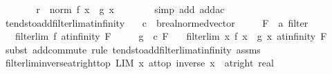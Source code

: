 \begin{isabellebody}
\ \ \ \ \isamarkupfalse%
\ \isamarkupfalse%
\ {\isachardoublequoteopen}r\ {\isasymle}\ norm\ {\isacharparenleft}{\kern0pt}f\ x\ {\isacharplus}{\kern0pt}\ g\ x{\isacharparenright}{\kern0pt}{\isachardoublequoteclose}\isanewline
\ \ \ \ \ \ \isamarkupfalse%
\ {\isacharparenleft}{\kern0pt}simp\ add{\isacharcolon}{\kern0pt}\ add{\isacharunderscore}{\kern0pt}ac{\isacharparenright}{\kern0pt}\isanewline
\ \ \isamarkupfalse%
\isanewline
{}\isamarkupfalse%
%
\endisatagproof
{\isafoldproof}%
%
\isadelimproof
\isanewline
%
\endisadelimproof
\isanewline
{}\isamarkupfalse%
\ tendsto{\isacharunderscore}{\kern0pt}add{\isacharunderscore}{\kern0pt}filterlim{\isacharunderscore}{\kern0pt}at{\isacharunderscore}{\kern0pt}infinity{\isacharprime}{\kern0pt}{\isacharcolon}{\kern0pt}\isanewline
\ \ \ c\ {\isacharcolon}{\kern0pt}{\isacharcolon}{\kern0pt}\ {\isachardoublequoteopen}{\isacharprime}{\kern0pt}b{\isacharcolon}{\kern0pt}{\isacharcolon}{\kern0pt}real{\isacharunderscore}{\kern0pt}normed{\isacharunderscore}{\kern0pt}vector{\isachardoublequoteclose}\isanewline
\ \ \ \ \ F\ {\isacharcolon}{\kern0pt}{\isacharcolon}{\kern0pt}\ {\isachardoublequoteopen}{\isacharprime}{\kern0pt}a\ filter{\isachardoublequoteclose}\isanewline
\ \ \ {\isachardoublequoteopen}filterlim\ f\ at{\isacharunderscore}{\kern0pt}infinity\ F{\isachardoublequoteclose}\isanewline
\ \ \ \ \ {\isachardoublequoteopen}{\isacharparenleft}{\kern0pt}g\ {\isasymlonglongrightarrow}\ c{\isacharparenright}{\kern0pt}\ F{\isachardoublequoteclose}\isanewline
\ \ \ {\isachardoublequoteopen}filterlim\ {\isacharparenleft}{\kern0pt}{\isasymlambda}x{\isachardot}{\kern0pt}\ f\ x\ {\isacharplus}{\kern0pt}\ g\ x{\isacharparenright}{\kern0pt}\ at{\isacharunderscore}{\kern0pt}infinity\ F{\isachardoublequoteclose}\isanewline
%
\isadelimproof
\ \ %
\endisadelimproof
%
\isatagproof
{}\isamarkupfalse%
\ {\isacharparenleft}{\kern0pt}subst\ add{\isachardot}{\kern0pt}commute{\isacharparenright}{\kern0pt}\ {\isacharparenleft}{\kern0pt}rule\ tendsto{\isacharunderscore}{\kern0pt}add{\isacharunderscore}{\kern0pt}filterlim{\isacharunderscore}{\kern0pt}at{\isacharunderscore}{\kern0pt}infinity\ assms{\isacharparenright}{\kern0pt}{\isacharplus}{\kern0pt}%
\endisatagproof
{\isafoldproof}%
%
\isadelimproof
\isanewline
%
\endisadelimproof
\isanewline
{}\isamarkupfalse%
\ filterlim{\isacharunderscore}{\kern0pt}inverse{\isacharunderscore}{\kern0pt}at{\isacharunderscore}{\kern0pt}right{\isacharunderscore}{\kern0pt}top{\isacharcolon}{\kern0pt}\ {\isachardoublequoteopen}LIM\ x\ at{\isacharunderscore}{\kern0pt}top{\isachardot}{\kern0pt}\ inverse\ x\ {\isacharcolon}{\kern0pt}{\isachargreater}{\kern0pt}\ at{\isacharunderscore}{\kern0pt}right\ {\isacharparenleft}{\kern0pt}{}{\isacharcolon}{\kern0pt}{\isacharcolon}{\kern0pt}real{\isacharparenright}{\kern0pt}{\isachardoublequoteclose}\isanewline

\end{isabellebody}
